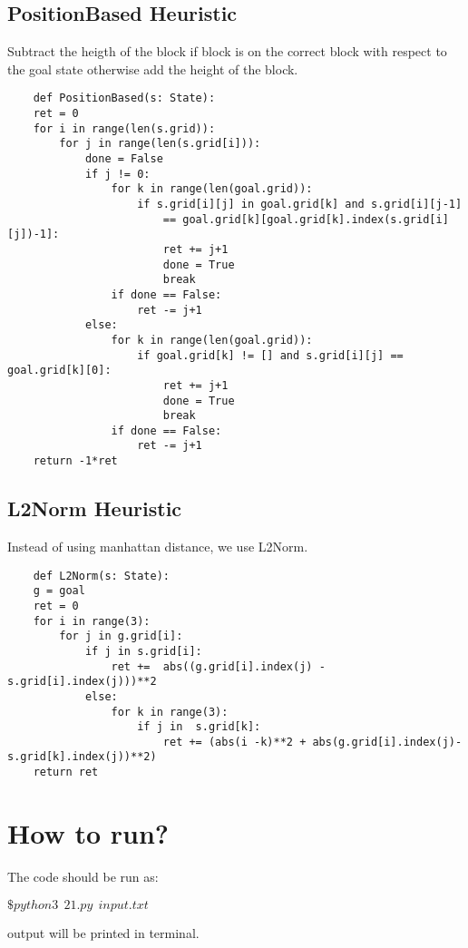 \documentclass{article}
\begin{document}
\subsection{PositionBased Heuristic}
Subtract the heigth of the block if block is on the correct block with respect to the goal state otherwise add the height of the block.
\begin{verbatim}
    def PositionBased(s: State):
    ret = 0
    for i in range(len(s.grid)):
        for j in range(len(s.grid[i])):
            done = False
            if j != 0:
                for k in range(len(goal.grid)):
                    if s.grid[i][j] in goal.grid[k] and s.grid[i][j-1] 
                        == goal.grid[k][goal.grid[k].index(s.grid[i][j])-1]:
                        ret += j+1
                        done = True
                        break
                if done == False:
                    ret -= j+1
            else:
                for k in range(len(goal.grid)):
                    if goal.grid[k] != [] and s.grid[i][j] == goal.grid[k][0]:
                        ret += j+1
                        done = True
                        break
                if done == False:
                    ret -= j+1
    return -1*ret
\end{verbatim}

\subsection{L2Norm Heuristic}
Instead of using manhattan distance, we use L2Norm.
\begin{verbatim}
    def L2Norm(s: State):
    g = goal
    ret = 0
    for i in range(3):
        for j in g.grid[i]:
            if j in s.grid[i]:
                ret +=  abs((g.grid[i].index(j) - s.grid[i].index(j)))**2
            else:
                for k in range(3):
                    if j in  s.grid[k]:
                        ret += (abs(i -k)**2 + abs(g.grid[i].index(j)-s.grid[k].index(j))**2)
    return ret
\end{verbatim}

\section{How to run?}
The code should be run as:

$ \$python3 ~~ 21.py ~~ input.txt$

output will be printed in terminal.
\end{document}
